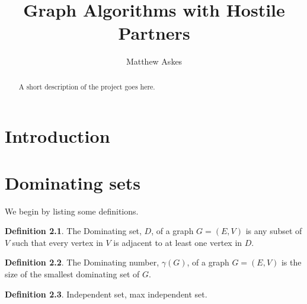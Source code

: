 \documentclass[11pt
              , a4paper
              , twoside
              , openright
              ]{report}
\title{Graph Algorithms with Hostile Partners}
\author{Matthew Askes}
\date{}
\theoremstyle{definition}
\newtheorem*{definition}{Definition}
\begin{document}
\frontmatter



\begin{abstract}

A short description of the project goes here.

\end{abstract}


\maketitle



\tableofcontents



\mainmatter


%
%
%
%
\chapter{Introduction}

\chapter{Dominating sets}

We begin by listing some definitions.

\begin{definition}
    The Dominating set, $D$, of a graph $G=(E,V)$ is any subset of $V$ such that every vertex in $V$ is adjacent to at least one vertex in $D$.
\end{definition}

\begin{definition}
    The Dominating number, $\gamma(G)$, of a graph $G=(E,V)$ is the size of the smallest dominating set of $G$.
\end{definition}

\begin{definition}
    Independent set, max independent set.
\end{definition}
\end{document}
